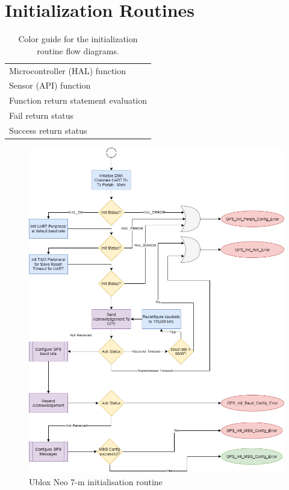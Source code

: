 \section{Initialization Routines}

\begin{table}[H]
    \centering
    \caption{Color guide for the initialization routine flow diagrams.}
    \begin{tabular}{l}
    \hline
       \cellcolor{micro}Microcontroller (HAL) function \\
        \cellcolor{sensor}Sensor (API) function \\
        \cellcolor{conditional}Function return statement evaluation \\
        \cellcolor{wrong}Fail return status \\
        \cellcolor{succ}Success return status\\
        \hline
    \end{tabular}

    \label{tab:Init_routine_Guide}
\end{table}


\begin{figure}[H]
    \centering
    \includegraphics[scale=0.3]{GPS Initialization Algorithm .png}
    \caption{Ublox Neo 7-m initialisation routine}
    \label{fig:Init_diagram_gps}
\end{figure}


